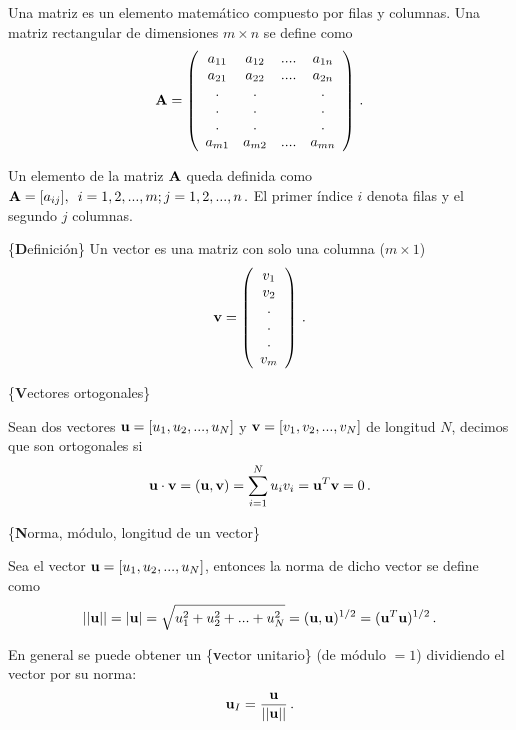 \documentclass[
]{agujournal2019}
\begin{document}
Una matriz es un elemento matemático compuesto por filas y columnas. Una
matriz rectangular de dimensiones \(m\times n\) se define como
\[{\textbf A}=\left(\begin{array}{cccc}
  a_{11} & a_{12} & .... & a_{1n}\\
  a_{21} & a_{22} & .... & a_{2n}\\
    .    &   .    &      &   . \\
    .    &   .    &      &   . \\
    .    &   .    &      &   . \\
  a_{m1} & a_{m2} & .... & a_{mn}\\
\end{array}
  \right)
\,.\]

Un elemento de la matriz \({\textbf A}\) queda definida como
\({\textbf A}=[a_{ij}],\,\,\,i=1,2,...,m; j=1,2,...,n\,.\) El primer
índice \(i\) denota filas y el segundo \(j\) columnas.

\vspace{0.5cm}

\{\noindent \textbf Definición\} Un vector es una matriz con solo una
columna (\(m\times1\)) \[{\textbf v}=\left( \begin{array}{c}
 v_1 \\ v_2 \\ . \\ . \\ . \\ v_m
       \end{array} \right)
       \,.\]

\vspace{0.5cm}

\{\noindent \textbf Vectores ortogonales\}

Sean dos vectores \({\textbf u}=[u_1,u_2,...,u_N]\) y
\({\textbf v}=[v_1,v_2,...,v_N]\) de longitud \(N\), decimos que son
ortogonales si
\[{\textbf u}\cdot{\textbf v}=({\textbf u},{\textbf v})=\sum\limits^N_{i=1} u_i v_i={\textbf u}^T{\textbf v}=0\,.\]

\vspace{0.5cm} \{\noindent \textbf Norma, módulo, longitud de un
vector\}

Sea el vector \({\textbf u}=[u_1,u_2,...,u_N]\), entonces la norma de
dicho vector se define como
\[||{\textbf u}||=|{\textbf u}|=\sqrt{u^2_1 + u^2_2 + ... + u^2_N}=({\textbf u},{\textbf u})^{1/2}=({\textbf u}^T{\textbf u})^{1/2}\,.\]

En general se puede obtener un \{\textbf vector unitario\} (de módulo
\(=1\)) dividiendo el vector por su norma:
\[{\textbf u}_I=\frac{{\textbf u}}{||{\textbf u}||}\,.\]
\end{document}
